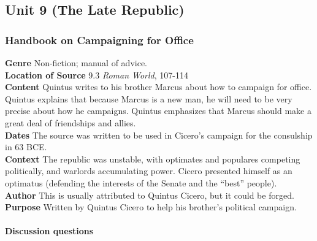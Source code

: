 \documentclass{article}
\begin{document}
\subsection*{Unit 9 (The Late Republic)}
\subsubsection*{Handbook on Campaigning for Office}
\textbf{Genre}
Non-fiction; manual of advice. \\
\textbf{Location of Source}
9.3 \textit{Roman World}, 107-114 \\
\textbf{Content}
Quintus writes to his brother Marcus about how to campaign for office. Quintus explains that
because Marcus is a new man, he will need to be very precise about how he campaigns.
Quintus emphasizes that Marcus should make a great deal of friendships and allies. \\
\textbf{Dates}
The source was written to be used in Cicero’s campaign for the consulship in 63 BCE. \\
\textbf{Context}
The republic was unstable, with optimates and populares competing politically, and warlords
accumulating power. Cicero presented himself as an optimatus (defending the interests of
the Senate and the “best” people). \\
\textbf{Author}
This is usually attributed to Quintus Cicero, but it could be forged. \\
\textbf{Purpose}
Written by Quintus Cicero to help his brother’s political campaign. \\
\\
\textbf{Discussion questions}
\end{document}
